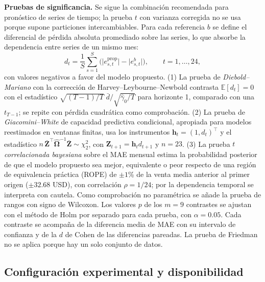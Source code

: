 \documentclass[pdflatex,sn-mathphys-num]{sn-jnl}
\begin{document}
\textbf{Pruebas de significancia.} Se sigue la combinación recomendada para pronóstico de series de tiempo; la prueba $t$ con varianza corregida \cite{nadeau2003} no se usa porque supone particiones intercambiables. Para cada referencia $b$ se define el diferencial de pérdida absoluta promediado sobre las series, lo que absorbe la dependencia entre series de un mismo mes:
\begin{equation}
d_t=\frac{1}{S}\sum_{s=1}^{S}\bigl(\lvert e^{\mathrm{prop}}_{s,t}\rvert-\lvert e^{b}_{s,t}\rvert\bigr),\qquad t=1,\dots,24,
\label{eq:dt}
\end{equation}
con valores negativos a favor del modelo propuesto. (1) La prueba de \emph{Diebold--Mariano} \cite{diebold1995} con la corrección de Harvey--Leybourne--Newbold \cite{harvey1997} contrasta $\mathbb{E}[d_t]=0$ con el estadístico $\sqrt{(T-1)/T}\;\bar{d}/\sqrt{\hat{\gamma}_0/T}$ para horizonte 1, comparado con una $t_{T-1}$; se repite con pérdida cuadrática como comprobación. (2) La prueba de \emph{Giacomini--White} \cite{giacomini2006} de capacidad predictiva condicional, apropiada para modelos reestimados en ventanas finitas, usa los instrumentos $\mathbf{h}_t=(1,d_t)^{\top}$ y el estadístico $n\,\bar{\mathbf{Z}}^{\top}\hat{\boldsymbol{\Omega}}^{-1}\bar{\mathbf{Z}}\sim\chi^2_2$, con $\mathbf{Z}_{t+1}=\mathbf{h}_t d_{t+1}$ y $n=23$. (3) La prueba $t$ \emph{correlacionada bayesiana} \cite{corani2015,benavoli2017} sobre el MAE mensual estima la probabilidad posterior de que el modelo propuesto sea mejor, equivalente o peor respecto de una región de equivalencia práctica (ROPE) de $\pm1$\% de la venta media anterior al primer origen ($\pm32.68$ USD), con correlación $\rho=1/24$; por la dependencia temporal se interpreta con cautela. Como comprobación no paramétrica se añade la prueba de rangos con signo de Wilcoxon. Los valores $p$ de los $m=9$ contrastes se ajustan con el método de Holm \cite{holm1979} por separado para cada prueba, con $\alpha=0.05$. Cada contraste se acompaña de la diferencia media de MAE con su intervalo de confianza y de la $d$ de Cohen de las diferencias pareadas. La prueba de Friedman no se aplica porque hay un solo conjunto de datos.

\subsection{Configuración experimental y disponibilidad}\label{subsec:config}
\end{document}
